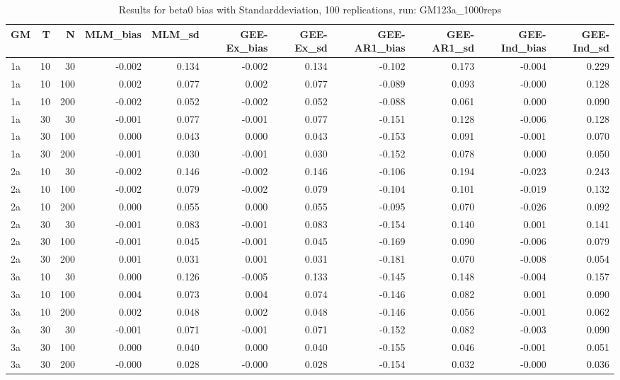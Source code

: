 \begin{table}[ht]
\centering
\begin{tabular}{lrrrrrrrrrr}
  \hline
GM & T & N & MLM\_bias & MLM\_sd & GEE-Ex\_bias & GEE-Ex\_sd & GEE-AR1\_bias & GEE-AR1\_sd & GEE-Ind\_bias & GEE-Ind\_sd \\ 
  \hline
1a & 10 & 30 & -0.002 & 0.134 & -0.002 & 0.134 & -0.102 & 0.173 & -0.004 & 0.229 \\ 
  1a & 10 & 100 & 0.002 & 0.077 & 0.002 & 0.077 & -0.089 & 0.093 & -0.000 & 0.128 \\ 
  1a & 10 & 200 & -0.002 & 0.052 & -0.002 & 0.052 & -0.088 & 0.061 & 0.000 & 0.090 \\ 
  1a & 30 & 30 & -0.001 & 0.077 & -0.001 & 0.077 & -0.151 & 0.128 & -0.006 & 0.128 \\ 
  1a & 30 & 100 & 0.000 & 0.043 & 0.000 & 0.043 & -0.153 & 0.091 & -0.001 & 0.070 \\ 
  1a & 30 & 200 & -0.001 & 0.030 & -0.001 & 0.030 & -0.152 & 0.078 & 0.000 & 0.050 \\ 
   \hline
2a & 10 & 30 & -0.002 & 0.146 & -0.002 & 0.146 & -0.106 & 0.194 & -0.023 & 0.243 \\ 
  2a & 10 & 100 & -0.002 & 0.079 & -0.002 & 0.079 & -0.104 & 0.101 & -0.019 & 0.132 \\ 
  2a & 10 & 200 & 0.000 & 0.055 & 0.000 & 0.055 & -0.095 & 0.070 & -0.026 & 0.092 \\ 
  2a & 30 & 30 & -0.001 & 0.083 & -0.001 & 0.083 & -0.154 & 0.140 & 0.001 & 0.141 \\ 
  2a & 30 & 100 & -0.001 & 0.045 & -0.001 & 0.045 & -0.169 & 0.090 & -0.006 & 0.079 \\ 
  2a & 30 & 200 & 0.001 & 0.031 & 0.001 & 0.031 & -0.181 & 0.070 & -0.008 & 0.054 \\ 
   \hline
3a & 10 & 30 & 0.000 & 0.126 & -0.005 & 0.133 & -0.145 & 0.148 & -0.004 & 0.157 \\ 
  3a & 10 & 100 & 0.004 & 0.073 & 0.004 & 0.074 & -0.146 & 0.082 & 0.001 & 0.090 \\ 
  3a & 10 & 200 & 0.002 & 0.048 & 0.002 & 0.048 & -0.146 & 0.056 & -0.001 & 0.062 \\ 
  3a & 30 & 30 & -0.001 & 0.071 & -0.001 & 0.071 & -0.152 & 0.082 & -0.003 & 0.090 \\ 
  3a & 30 & 100 & 0.000 & 0.040 & 0.000 & 0.040 & -0.155 & 0.046 & -0.001 & 0.051 \\ 
  3a & 30 & 200 & -0.000 & 0.028 & -0.000 & 0.028 & -0.154 & 0.032 & -0.000 & 0.036 \\ 
   \hline
\end{tabular}
\caption{Results for beta0 bias with Standarddeviation, 100 replications, run: GM123a_1000reps} 
\label{tab:beta0_bias_sd}
\end{table}
